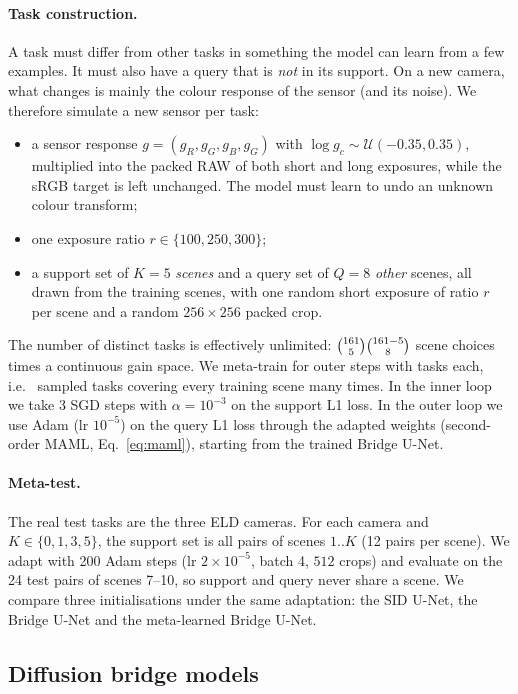 \paragraph{Task construction.} A task must differ from other tasks in something the model can learn from a few examples. It must also have a query that is \emph{not} in its support. On a new camera, what changes is mainly the colour response of the sensor (and its noise). We therefore simulate a new sensor per task:
\begin{itemize}
\item a sensor response $g=(g_R,g_G,g_B,g_G)$ with $\log g_c\sim\mathcal{U}(-0.35,0.35)$, multiplied into the packed RAW of both short and long exposures, while the sRGB target is left unchanged. The model must learn to undo an unknown colour transform;
\item one exposure ratio $r\in\{100,250,300\}$;
\item a support set of $K=5$ \emph{scenes} and a query set of $Q=8$ \emph{other} scenes, all drawn from the \SIDTRAINSCENES{} training scenes, with one random short exposure of ratio $r$ per scene and a random $256\times256$ packed crop.
\end{itemize}
The number of distinct tasks is effectively unlimited: $\binom{161}{5}\binom{161-5}{8}$ scene choices times a continuous gain space. We meta-train for \METAITERS{} outer steps with \METABATCH{} tasks each, i.e.\ \METATASKS{} sampled tasks covering every training scene many times. In the inner loop we take 3 SGD steps with $\alpha=10^{-3}$ on the support L1 loss. In the outer loop we use Adam (lr $10^{-5}$) on the query L1 loss through the adapted weights (second-order MAML, Eq.~\ref{eq:maml}), starting from the trained Bridge U-Net.

\paragraph{Meta-test.} The real test tasks are the three ELD cameras. For each camera and $K\in\{0,1,3,5\}$, the support set is all pairs of scenes $1..K$ (12 pairs per scene). We adapt with 200 Adam steps (lr $2\times10^{-5}$, batch 4, $512$ crops) and evaluate on the 24 test pairs of scenes 7--10, so support and query never share a scene. We compare three initialisations under the same adaptation: the SID U-Net, the Bridge U-Net and the meta-learned Bridge U-Net.

\subsection{Diffusion bridge models}
\label{sec:ddbm}

